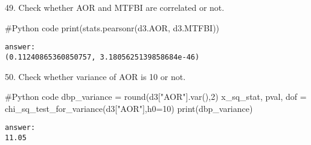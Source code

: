 \documentclass{article}
\begin{document}
49.	Check whether AOR and MTFBI are correlated or not.
\begin{pythoncode}
#Python code
print(stats.pearsonr(d3.AOR, d3.MTFBI))
\end{pythoncode}

\begin{verbatim}
answer: 
(0.11240865360850757, 3.1805625139858684e-46)
\end{verbatim}


50.	Check whether variance of AOR is 10 or not.
\begin{pythoncode}
#Python code
dbp_variance = round(d3["AOR"].var(),2)  
x_sq_stat, pval, dof = chi_sq_test_for_variance(d3["AOR"],h0=10)
print(dbp_variance)

\end{pythoncode}

\begin{verbatim}
answer: 
11.05
\end{verbatim}
\end{document}
